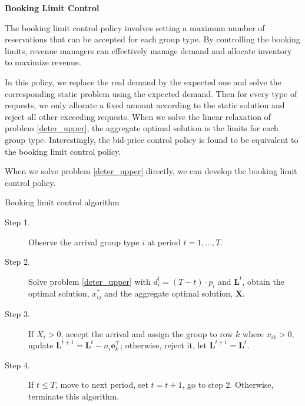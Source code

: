 {\bf{Booking Limit Control}}

The booking limit control policy involves setting a maximum number of reservations that can be accepted for each group type. By controlling the booking limits, revenue managers can effectively manage demand and allocate inventory to maximize revenue.

In this policy, we replace the real demand by the expected one and solve the corresponding static problem using the expected demand. Then for every type of requests, we only allocate a fixed amount according to the static solution and reject all other exceeding requests. When we solve the linear relaxation of problem \eqref{deter_upper}, the aggregate optimal solution is the limits for each group type. Interestingly, the bid-price control policy is found to be equivalent to the booking limit control policy.

When we solve problem \eqref{deter_upper} directly, we can develop the booking limit control policy.

\begin{algorithm}[H]
  \caption{Booking limit control algorithm}
  \begin{description}
    \item[Step 1.] Observe the arrival group type $i$ at period $t = 1, \ldots, T$.
    \item[Step 2.] Solve problem \eqref{deter_upper} with $d_i^{t} = (T-t) \cdot p_i$ and $\mathbf{L}^{t}$, obtain the optimal solution, $x_{ij}^{*}$ and the aggregate optimal solution, $\mathbf{X}$.
    \item[Step 3.] If $X_{i} > 0$, accept the arrival and assign the group to row $k$ where $x_{ik} > 0$, update $\mathbf{L}^{t+1} = \mathbf{L}^{t} - n_i \mathbf{e}_{k}^{\top}$; otherwise, reject it, let $\mathbf{L}^{t+1} = \mathbf{L}^{t}$.
    \item[Step 4.] If $t \leq T$, move to next period, set $t = t+1$, go to step 2. Otherwise, terminate this algorithm.
  \end{description}
\end{algorithm}




